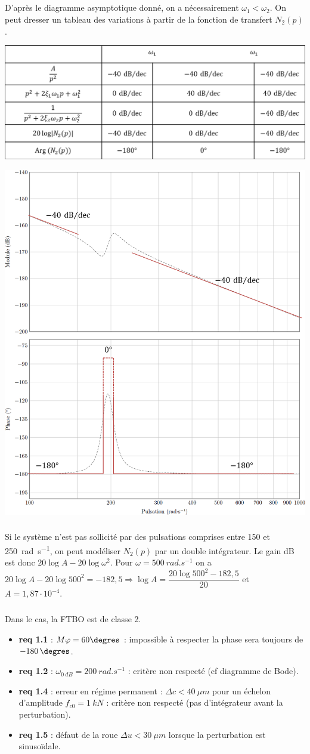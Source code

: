 \documentclass[10pt,fleqn]{article} %
\begin{document}
\subparagraph{}
D'après le diagramme asymptotique donné, on a nécessairement $\omega_1<\omega_2$. On peut dresser un tableau des variations à partir de la fonction de transfert $N_2(p)$. 
\begin{center}
\includegraphics[width=.7\linewidth]{images/fig_06}

\includegraphics[width=.7\linewidth]{images/fig_07}
\end{center}

\subparagraph{}
Si le système n'est pas sollicité par des pulsations comprises entre 150 et \SI{250}{rad.s^{-1}}, on peut modéliser $N_2(p)$ par un double intégrateur. 
Le gain dB est donc  $20\log A - 20 \log \omega^2$.  Pour $\omega=\SI{500}{rad.s^{-1}}$ on a $20\log A - 20 \log 500^2=-182,5 \Rightarrow \log A = \dfrac{20 \log 500^2-182,5}{20}$ et $A=1,87\cdot 10^{-4}$.
\subparagraph{}

Dans le cas, la FTBO est de classe 2.
\begin{itemize}
\item \textbf{req 1.1} : $M\varphi = 60\degres$ : impossible à respecter la phase sera toujours de $\SI{-180}{\degres}$.
\item \textbf{req 1.2} : $\omega_{\SI{0}{dB}}=\SI{200}{rad.s^{-1}}$ : critère non respecté (cf diagramme de Bode).
\item \textbf{req 1.4} : erreur en régime permanent : $\Delta c < \SI{40}{\mu m}$ pour un échelon d'amplitude $f_{c0}=\SI{1}{kN}$ : critère non respecté (pas d'intégrateur avant la perturbation).
\item \textbf{req 1.5} : défaut de la roue $\Delta u < \SI{30}{\mu m}$ lorsque la perturbation est sinusoïdale.
\end{itemize}
\end{document}
